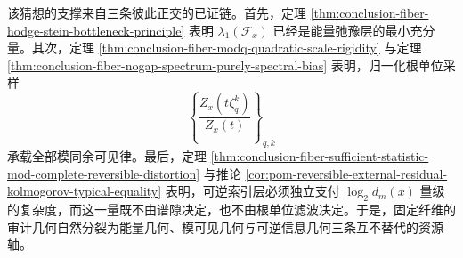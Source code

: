 \noindent
该猜想的支撑来自三条彼此正交的已证链。首先，定理 \ref{thm:conclusion-fiber-hodge-stein-bottleneck-principle} 表明 \(\lambda_1(\mathcal F_x)\) 已经是能量弛豫层的最小充分量。其次，定理 \ref{thm:conclusion-fiber-modq-quadratic-scale-rigidity} 与定理 \ref{thm:conclusion-fiber-nogap-spectrum-purely-spectral-bias} 表明，归一化根单位采样
\[
\left\{\frac{Z_x(t\zeta_q^k)}{Z_x(t)}\right\}_{q,k}
\]
承载全部模同余可见律。最后，定理 \ref{thm:conclusion-fiber-sufficient-statistic-mod-complete-reversible-distortion} 与推论 \ref{cor:pom-reversible-external-residual-kolmogorov-typical-equality} 表明，可逆索引层必须独立支付 \(\log_2 d_m(x)\) 量级的复杂度，而这一量既不由谱隙决定，也不由根单位滤波决定。于是，固定纤维的审计几何自然分裂为能量几何、模可见几何与可逆信息几何三条互不替代的资源轴。

\endinput
